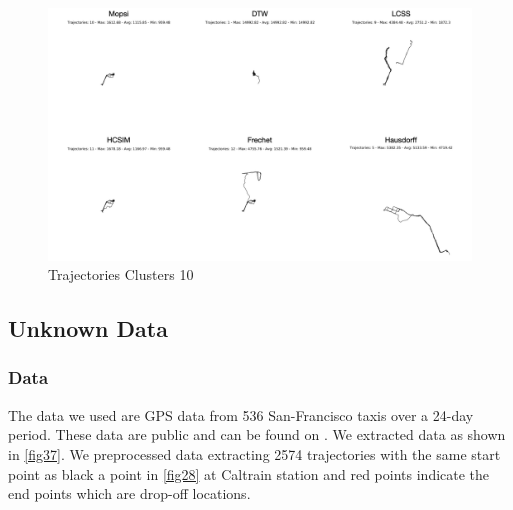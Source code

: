 \documentclass[a4paper, 12pt]{article}
\begin{document}
\begin{figure}[htbp!]
    \centering
    \includegraphics[width=1\textwidth]{Mopsi Clusters 10.png}
    \caption{Trajectories Clusters 10}
    \label{fig36}
\end{figure}

\pagebreak

\subsection{Unknown Data}

\subsubsection{Data}
The data we used are GPS data from 536 San-Francisco taxis over a 24-day period. These data are public and can be found on \cite{piorkowski2009crawdad}. We extracted data as shown in \autoref{fig37}. We preprocessed data extracting 2574 trajectories with the same start point as black a point in \autoref{fig28} at Caltrain station and red points indicate the end points which are drop-off locations.

\end{document}

